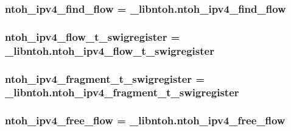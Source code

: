 \hypertarget{namespacelibntoh_a6ea32ebc3ddff0b34c9a0e61080aa209}{
\subsubsection[{ntoh\-\_\-ipv4\-\_\-find\-\_\-flow}]{\setlength{\rightskip}{0pt plus 5cm}ntoh\-\_\-ipv4\-\_\-find\-\_\-flow = \-\_\-libntoh.\-ntoh\-\_\-ipv4\-\_\-find\-\_\-flow}}\label{namespacelibntoh_a6ea32ebc3ddff0b34c9a0e61080aa209}
\hypertarget{namespacelibntoh_a98c23f7ef411fee94d7bf8fd7e44fa5a}{
\subsubsection[{ntoh\-\_\-ipv4\-\_\-flow\-\_\-t\-\_\-swigregister}]{\setlength{\rightskip}{0pt plus 5cm}ntoh\-\_\-ipv4\-\_\-flow\-\_\-t\-\_\-swigregister = \-\_\-libntoh.\-ntoh\-\_\-ipv4\-\_\-flow\-\_\-t\-\_\-swigregister}}\label{namespacelibntoh_a98c23f7ef411fee94d7bf8fd7e44fa5a}
\hypertarget{namespacelibntoh_a618c1e32d36b56c0344acfcbe8607b7a}{
\subsubsection[{ntoh\-\_\-ipv4\-\_\-fragment\-\_\-t\-\_\-swigregister}]{\setlength{\rightskip}{0pt plus 5cm}ntoh\-\_\-ipv4\-\_\-fragment\-\_\-t\-\_\-swigregister = \-\_\-libntoh.\-ntoh\-\_\-ipv4\-\_\-fragment\-\_\-t\-\_\-swigregister}}\label{namespacelibntoh_a618c1e32d36b56c0344acfcbe8607b7a}
\hypertarget{namespacelibntoh_a61425564a2195c4e763fd6dec8c5c808}{
\subsubsection[{ntoh\-\_\-ipv4\-\_\-free\-\_\-flow}]{\setlength{\rightskip}{0pt plus 5cm}ntoh\-\_\-ipv4\-\_\-free\-\_\-flow = \-\_\-libntoh.\-ntoh\-\_\-ipv4\-\_\-free\-\_\-flow}}\label{namespacelibntoh_a61425564a2195c4e763fd6dec8c5c808}
